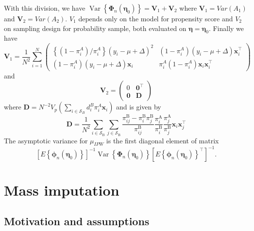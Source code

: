 \documentclass[
  letterpaper,
  DIV=11,
  numbers=noendperiod]{scrreprt}
\begin{document}
With this division, we have
\(\operatorname{Var}\left\{\boldsymbol{\Phi}_n\left(\boldsymbol{\eta}_0\right)\right\}=\mathbf{V}_1+\mathbf{V}_2\)
where \(\mathbf{V}_1 = Var \left(A_1\right)\) and
\(\mathbf{V}_2 = Var \left(A_2\right)\). \(V_1\) depends only on the
model for propensity score and \(V_2\) on sampling design for
probability sample, both evaluated on
\(\boldsymbol{\eta} = \boldsymbol{\eta}_0\). Finally we have \[
\mathbf{V}_1=\frac{1}{N^2} \sum_{i=1}^N\left(\begin{array}{cc}
\left\{\left(1-\pi_i^A\right) / \pi_i^A\right\}\left(y_i-\mu+\Delta\right)^2 & \left(1-\pi_i^A\right)\left(y_i-\mu+\Delta\right) \boldsymbol{x}_i^{\top} \\
\left(1-\pi_i^A\right)\left(y_i-\mu+\Delta\right) \boldsymbol{x}_i & \pi_i^A\left(1-\pi_i^A\right) \boldsymbol{x}_i \boldsymbol{x}_i^{\top}
\end{array}\right)
\] and \[
\mathbf{V}_2=\left(\begin{array}{ll}
0 & \mathbf{0}^{\top} \\
\mathbf{0} & \mathbf{D}
\end{array}\right)
\] where
\(\mathbf{D}=N^{-2} V_p\left(\sum_{i \in \mathcal{S}_B} d_i^B \pi_i^A \boldsymbol{x}_i\right)\)
and is given by \[
\begin{equation}
{\mathbf{D}}=\frac{1}{N^2} \sum_{i \in \mathcal{S}_{\mathrm{B}}} \sum_{j \in \mathcal{S}_{\mathrm{B}}} \frac{\pi_{i j}^{\mathrm{B}}-\pi_i^{\mathrm{B}} \pi_j^{\mathrm{B}}}{\pi_{i j}^{\mathrm{B}}} \frac{{\pi}_i^{\mathrm{A}}}{\pi_i^{\mathrm{B}}} \frac{{\pi}_j^{\mathrm{A}}}{\pi_j^{\mathrm{B}}} \boldsymbol{x}_i \boldsymbol{x}_j^{\top}
\end{equation}
\] The asymptotic variance for \(\mu_{IPW}\) is the first diagonal
element of matrix \[
\left[E\left\{\boldsymbol{\phi}_n\left(\boldsymbol{\eta}_0\right)\right\}\right]^{-1} \operatorname{Var}\left\{\boldsymbol{\Phi}_n\left(\boldsymbol{\eta}_0\right)\right\}\left[E\left\{\boldsymbol{\phi}_n\left(\boldsymbol{\eta}_0\right)\right\}^{\top}\right]^{-1}.
\]


\hypertarget{mass-imputation}{%
\chapter{Mass imputation}\label{mass-imputation}}

\hypertarget{motivation-and-assumptions-1}{%
\section{Motivation and
assumptions}\label{motivation-and-assumptions-1}}
\end{document}

